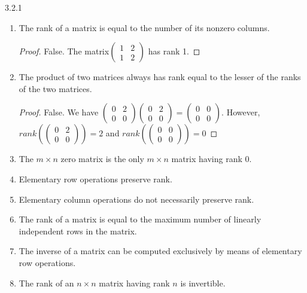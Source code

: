 \documentclass[12pt, a4paper]{article}
\theoremstyle{plain}
\begin{document}
\begin{exercise}{3.2.1}
\hfill
	\begin{enumerate}[label=(\alph*)]
	\item The rank of a matrix is equal to the number of its nonzero columns.
		\begin{proof}
		False. The matrix$\begin{pmatrix}
		1&2\\
		1&2
		\end{pmatrix}$ has rank 1.
		\end{proof}
	\item The product of two matrices always has rank equal to the lesser of the ranks of the two matrices.
		\begin{proof}
		False. We have $\begin{pmatrix}
		0&2\\
		0&0
		\end{pmatrix}\begin{pmatrix}
		0&2\\
		0&0
		\end{pmatrix}=\begin{pmatrix}
		0&0\\
		0&0
		\end{pmatrix}$. However, $rank\left(\begin{pmatrix}
		0&2\\
		0&0
		\end{pmatrix}\right)=2$ and $rank\left(\begin{pmatrix}
		0&0\\
		0&0
		\end{pmatrix}\right)=0$
		\end{proof}
	\item The $m\times n$ zero matrix is the only $m\times n$ matrix having rank $0$.
	\item Elementary row operations preserve rank.
	\item Elementary column operations do not necessarily preserve rank.
	\item The rank of a matrix is equal to the maximum number of linearly independent rows in the matrix.
	\item The inverse of a matrix can be computed exclusively by means of elementary row operations.
	\item The rank of an $n\times n$ matrix having rank $n$ is invertible.
	\end{enumerate}
\end{exercise}

\pagebreak
	
\end{document}
